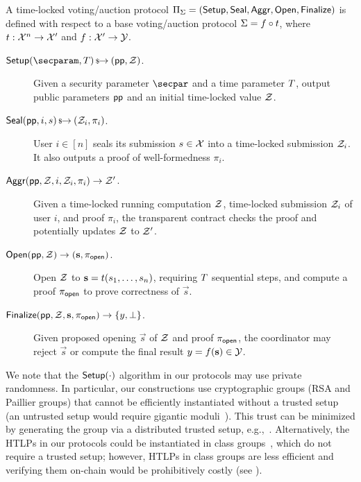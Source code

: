 \begin{definition}\label{def:syntax}
A time-locked voting/auction protocol $\Pi_\Sigma = (\mathsf{Setup}, \mathsf{Seal},\allowbreak \mathsf{Aggr}, \mathsf{Open}, \mathsf{Finalize})$ is defined with respect to a base voting/auction protocol $\Sigma = f \circ t$, where $t : \mathcal{X}^n \to \mathcal{X}'$ and $f : \mathcal{X}' \to \mathcal{Y}$. %

\begin{description}
    \item[$\Setup(\secparam, \Ttime) \randout (\pparam, \Z)$.] Given a security parameter $\secpar$ and a time parameter $T$, output public parameters $\mathsf{pp}$ and an initial time-locked value $\mathcal{Z}$.
    \item[$\mathsf{Seal}(\mathsf{pp}, i, s) \,{\mbox{\scriptsize${\$}$\normalsize}\!\!\to}\hskip2.3pt (\mathcal{Z}_i, \pi_i)$.] User $i\in[n]$ seals its submission $s \in \mathcal{X}$ into a time-locked submission %
    $\mathcal{Z}_i$. It also outputs a proof of well-formedness $\pi_i$.
    \item[$\mathsf{Aggr}(\mathsf{pp}, \mathcal{Z}, i, \mathcal{Z}_i, \pi_i) \to \mathcal{Z}'$.] Given a time-locked running computation %
    $\mathcal{Z}$, time-locked submission $\mathcal{Z}_i$ of user $i$, and proof $\pi_i$, the transparent contract checks the proof and potentially updates $\mathcal{Z}$ to $\mathcal{Z}'$. %
    \item[$\mathsf{Open}(\mathsf{pp}, \mathcal{Z}) \to (\mathbf{s}, \pi_{\mathsf{open}})$.] Open $\mathcal{Z}$ to $\mathbf{s} = t(s_1, \dots, s_n)$, requiring $T$ sequential steps, and compute a proof $\pi_{\mathsf{open}}$ to prove correctness of $\vec{s}$.
    \item[$\mathsf{Finalize}(\mathsf{pp}, \mathcal{Z}, \mathbf{s}, \pi_{\mathsf{open}}) \to \{y, \perp\}$.] Given proposed opening $\vec{s}$ of $\mathcal{Z}$ and proof $\pi_{\sf open}$, the coordinator may reject $\vec{s}$ or compute the final result $y = f(\mathbf{s}) \in \mathcal{Y}$. %
\end{description}
\end{definition}

We note that the $\mathsf{Setup}(\cdot)$ algorithm in our protocols may use private randomness. In particular, our constructions use cryptographic groups (RSA and Paillier groups) that cannot be efficiently instantiated without a trusted setup (an untrusted setup would require gigantic moduli~\cite{ICICS:Sander99}). This trust can be minimized by generating the group via a distributed trusted setup, e.g.,~\cite{JACM:BonFra01,SP:CHIKMRsVW21,TCC:DamMik10}.
Alternatively, the HTLPs in our protocols could be instantiated in class groups~\cite{CCS:TCLM21}, which do not require a trusted setup; however, HTLPs in class groups are less efficient and verifying them on-chain would be prohibitively costly 
(see ).

